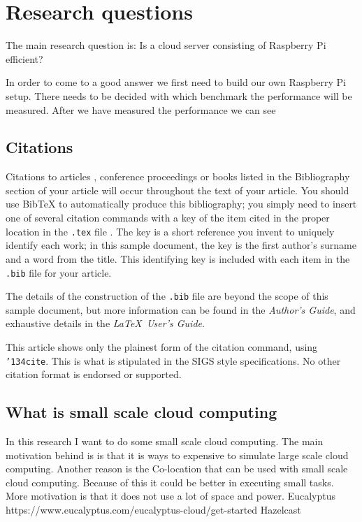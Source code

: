 \documentclass{sig-alternate-br}
\begin{document}
\section{Research questions}
The main research question
is: Is a cloud server consisting of Raspberry Pi efficient?

In order to come to a good answer we first need to build our own Raspberry Pi setup. There needs to be decided with which benchmark the performance will be measured. After we have measured the performance we can see   

\subsection{Citations}
Citations to articles \cite{bowman:reasoning, clark:pct,
braams:babel, herlihy:methodology}, conference proceedings
\cite{clark:pct} or books \cite{salas:calculus, Lamport:LaTeX}
listed in the Bibliography section of your article will occur
throughout the text of your article. You should use BibTeX to
automatically produce this bibliography; you simply need to insert
one of several citation commands with a key of the item cited in
the proper location in the \texttt{.tex} file
\cite{Lamport:LaTeX}. The key is a short reference you invent to
uniquely identify each work; in this sample document, the key is
the first author's surname and a word from the title.  This
identifying key is included with each item in the \texttt{.bib}
file for your article.

The details of the construction of the \texttt{.bib} file are
beyond the scope of this sample document, but more information can
be found in the \textit{Author's Guide}, and exhaustive details in
the \textit{\LaTeX\ User's Guide}\cite{Lamport:LaTeX}.

This article shows only the plainest form of the citation command,
using \texttt{{\char'134}cite}. This is what is stipulated in the
SIGS style specifications. No other citation format is endorsed or
supported.
\subsection{What is small scale cloud computing}
In this research I want to do some small scale cloud computing. The main motivation behind is is that it is ways to expensive to simulate large scale cloud computing. Another reason is the Co-location that can be used with small scale cloud computing. Because of this it could be better in executing small tasks. More motivation is that it does not use a lot of space and power. 
Eucalyptus https://www.eucalyptus.com/eucalyptus-cloud/get-started
Hazelcast
\end{document}
